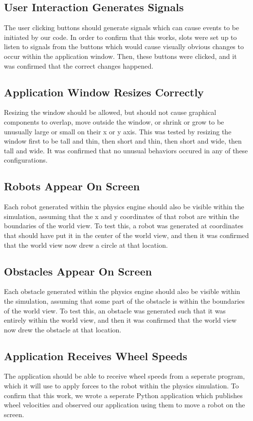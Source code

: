 \subsection{User Interaction Generates Signals}
The user clicking buttons should generate signals which can cause events to be initiated by our code. In order to confirm that this works, slots were set up to listen to signals from the buttons which would cause visually obvious changes to occur within the application window. Then, these buttons were clicked, and it was confirmed that the correct changes happened.

\subsection{Application Window Resizes Correctly}
Resizing the window should be allowed, but should not cause graphical components to overlap, move outside the window, or shrink or grow to be unusually large or small on their x or y axis. This was tested by resizing the window first to be tall and thin, then short and thin, then short and wide, then tall and wide. It was confirmed that no unusual behaviors occured in any of these configurations.

\subsection{Robots Appear On Screen}
Each robot generated within the physics engine should also be visible within the simulation, assuming that the x and y coordinates of that robot are within the boundaries of the world view. To test this, a robot was generated at coordinates that should have put it in the center of the world view, and then it was confirmed that the world view now drew a circle at that location.

\subsection{Obstacles Appear On Screen}
Each obstacle generated within the physics engine should also be visible within the simulation, assuming that some part of the obstacle is within the boundaries of the world view. To test this, an obstacle was generated such that it was entirely within the world view, and then it was confirmed that the world view now drew the obstacle at that location.

\subsection{Application Receives Wheel Speeds}
The application should be able to receive wheel speeds from a seperate program, which it will use to apply forces to the robot within the physics simulation. To confirm that this work, we wrote a seperate Python application which publishes wheel velocities and observed our application using them to move a robot on the screen.

